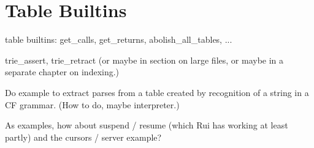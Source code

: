 \section{Table Builtins}

table builtins: get\_calls, get\_returns, abolish\_all\_tables, ...

trie\_assert, trie\_retract (or maybe in section on large files, or
maybe in a separate chapter on indexing.)

Do example to extract parses from a table created by recognition of a
string in a CF grammar.  (How to do, maybe interpreter.)

As examples, how about suspend / resume (which Rui has working at least
partly) and the cursors / server example?

